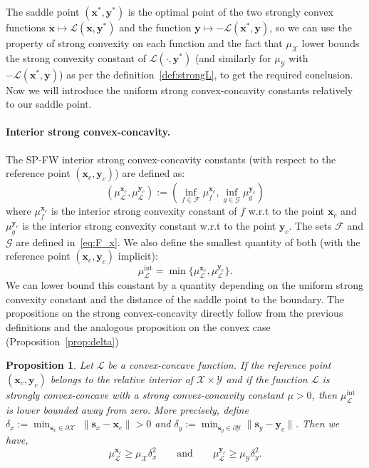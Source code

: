 \documentclass[twoside]{article}
\renewcommand{\L}{\mathcal{L}}
\newcommand{\X}{\mathcal{X}}
\newcommand{\Y}{\mathcal{Y}}
\newcommand{\x}{\bm{x}}
\newcommand{\y}{\bm{y}}
\newcommand{\s}{\bm{s}}
\newtheorem{proposition}[definition]{Proposition}
\newcommand{\xc}{\x_c} %
\newcommand{\yc}{\y_c} %
\newcommand{\muIntL}{\mu^{\text{int}}_\L} %
\newcommand{\0}{\mathbf{0}} %
\begin{document}
  \proof 
    The saddle point $(\x^*,\y^*)$ is the optimal point of the two strongly convex functions $\x \mapsto \L(\x,\y^*)$ and the function $\y \mapsto -\L(\x^*,\y)$, so we can use the property of strong convexity on each function and the fact that $\mu_\X$ lower bounds the strong convexity constant of $\L(\cdot,\y^*)$ (and similarly for $\mu_\Y$ with $-\L(\x^*,\y)$) as per the definition~\eqref{def:strongL}, to get the required conclusion.
  \endproof
  Now we will introduce the uniform strong convex-concavity constants relatively to our saddle point.
\paragraph{Interior strong convex-concavity.} %
\label{par:interior_strong_convex_concavity}
%
   The SP-FW interior strong convex-concavity constants (with respect to the reference point $(\xc, \yc)$) are defined as: 
    \begin{equation} 
  \label{def:interior_strongL}
    \left(\mu^{\xc}_\L,\mu^{\yc}_\L \right) := \left(\inf_{f \in \mathcal F} \mu^{\xc}_f, \inf_{g\in \mathcal G} \mu^{\yc}_g \right)
    \end{equation}
    where $\mu^{\xc}_f$ is the  interior strong convexity constant of $f$ w.r.t to the point $\xc$ and $ \mu^{\yc}_g$ is the interior strong convexity constant w.r.t to the point $\yc$. The sets $\mathcal F$ and $\mathcal G$ are defined in~\eqref{eq:F_x}. We also define the smallest quantity of both (with the reference point $(\xc, \yc)$ implicit):
    \begin{equation}
    \muIntL = \min\{\mu^{\xc}_\L, \mu^{\yc}_\L\}.
    \end{equation}
    We can lower bound this constant by a quantity depending on the uniform strong convexity constant and the distance of the saddle point to the boundary.
   The propositions on the strong convex-concavity directly follow from the previous definitions and the analogous proposition on the convex case (Proposition~\ref{prop:delta})

  \begin{proposition}\label{prop:deltaL}
    Let $\L$ be a convex-concave function. If the reference point
    $(\xc,\yc)$ belongs to the relative interior of $\X \times \Y$ and if the function
    $\L$ is strongly convex-concave with a strong convex-concavity constant $\mu > 0$,
    then $\muIntL$ is lower bounded away from zero. More precisely, define $\delta_x :=\min_{\s_x\in \partial\X } \; \|\s_x-\xc\|>0$ and $\delta_y := \min_{\s_y \in \partial\Y}\|\s_y-\yc\|$. Then we have,
    \begin{equation} \mu^{\xc}_\L \geq  \mu_\X \delta_x^2 
    \qquad \text{and}\qquad
    \mu^{\yc}_\L \geq \mu_\Y \delta^2_y. \end{equation}
  \end{proposition}
\end{document}

